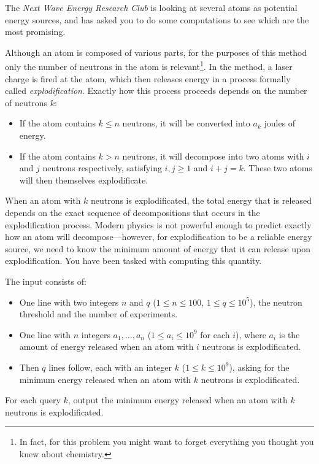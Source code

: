 
\providecommand{\maxn}{}
\renewcommand{\maxn}{100}
\providecommand{\maxa}{}
\renewcommand{\maxa}{10^9}
\providecommand{\maxq}{}
\renewcommand{\maxq}{10^5}
\providecommand{\maxk}{}
\renewcommand{\maxk}{10^9}

%
The \textit{Next Wave Energy Research Club} is looking at several atoms as potential energy sources, and has asked
you to do some computations to see which are the most promising.

Although an atom is composed of various parts, for the purposes of this method only the number of neutrons in
the atom is relevant\footnote{In fact, for this problem you might want to forget everything you thought you knew
about chemistry.}. In the method, a laser charge is fired at the atom, which then releases energy in a process
formally called \textit{explodification}. Exactly how this process proceeds depends on the number of neutrons $k$:
\begin{itemize}
	\item If the atom contains $k \leq n$ neutrons, it will be converted into $a_k$ joules of energy.
	\item If the atom contains $k > n$ neutrons, it will decompose into two atoms with $i$ and $j$ neutrons
		respectively, satisfying $i,j \geq 1$ and $i+j=k$. These two atoms will then themselves explodificate.
\end{itemize}

When an atom with $k$ neutrons is explodificated, the total energy that is released depends on the exact sequence
of decompositions that occurs in the explodification process. Modern physics is not powerful enough to predict
exactly how an atom will decompose---however, for explodification to be a reliable energy source, we need to know 
the minimum amount of energy that it can release upon explodification. You have
been tasked with computing this quantity.

\begin{Input}
The input consists of:
\begin{itemize}
    \item One line with two integers $n$ and $q$ ($1 \leq n \leq \maxn$, $1 \leq q \leq \maxq$), the neutron threshold and the number of experiments.
    \item One line with $n$ integers $a_1,\ldots,a_n$ ($1 \leq a_i \leq \maxa$ for each $i$), where $a_i$ is the
		amount of energy released when an atom with $i$ neutrons is explodificated.
    \item Then $q$ lines follow, each with an integer $k$ ($1 \leq k \leq \maxk$), asking for the minimum
		energy released when an atom with $k$ neutrons is explodificated.
\end{itemize}
\end{Input}

\begin{Output}
For each query $k$, output the minimum energy released when an atom with $k$
neutrons is explodificated.
\end{Output}

